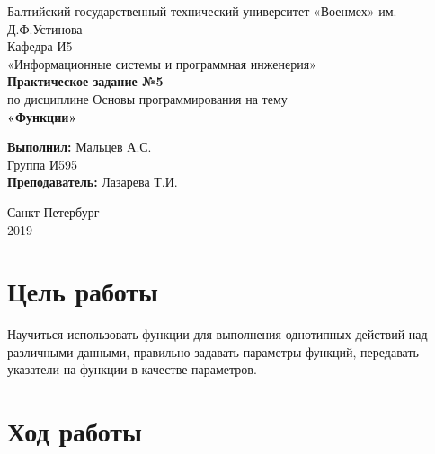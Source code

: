 \documentclass[a4paper,14pt]{extarticle}
\begin{document}
\begin{titlepage}
\centering
\small Балтийский государственный технический университет «Военмех» им. Д.Ф.Устинова \\
\vspace{3cm}
\normalsize Кафедра И5\\
«Информационные системы и программная инженерия»\\
\vspace{3cm}
\textbf{Практическое задание №5}\\
по дисциплине Основы программирования на тему\\ 
\textbf{«Функции»}\\
\vfill

\begin{flushleft}
\textbf{Выполнил:}
\hfill {Мальцев А.С.} \\
\hfill {Группа И595} \\
\vspace{1cm}
\textbf{Преподаватель:}
\hfill {Лазарева Т.И.} \\
\end{flushleft}
\vspace{3cm}

{\centering Санкт-Петербург \\ 
\vspace{0.15cm}
2019}
\end{titlepage}

\setcounter{page}{2}
\section{Цель работы}
Научиться использовать функции для выполнения однотипных действий над различными данными, правильно задавать параметры функций, передавать указатели на функции в качестве параметров.

\section{Ход работы}
\end{document}
